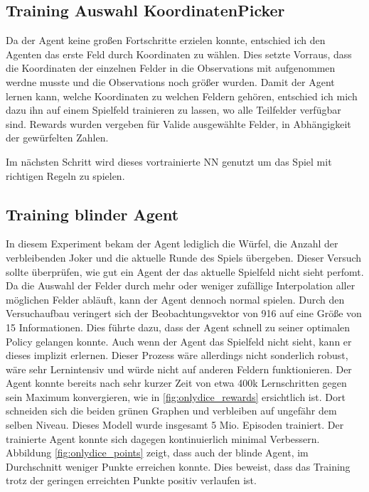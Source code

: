 \subsection{Training Auswahl KoordinatenPicker}
Da der Agent keine großen Fortschritte erzielen konnte, entschied ich den Agenten das erste Feld durch Koordinaten zu wählen.
Dies setzte Vorraus, dass die Koordinaten der einzelnen Felder in die Observations mit aufgenommen werdne musste und die Observations noch größer wurden.
Damit der Agent lernen kann, welche Koordinaten zu welchen Feldern gehören, entschied ich mich dazu ihn auf einem Spielfeld trainieren zu lassen, wo alle Teilfelder verfügbar sind.
Rewards wurden vergeben für Valide ausgewählte Felder, in Abhängigkeit der gewürfelten Zahlen.

Im nächsten Schritt wird dieses vortrainierte NN genutzt um das Spiel mit richtigen Regeln zu spielen.



\subsection{Training blinder Agent}
In diesem Experiment bekam der Agent lediglich die Würfel, die Anzahl der verbleibenden Joker und die aktuelle Runde des Spiels übergeben.
Dieser Versuch sollte überprüfen, wie gut ein Agent der das aktuelle Spielfeld nicht sieht perfomt. Da die Auswahl der Felder durch mehr oder weniger zufällige Interpolation aller möglichen Felder abläuft, kann der Agent dennoch normal spielen. Durch den Versuchaufbau veringert sich der Beobachtungsvektor von 916 auf eine Größe von 15 Informationen. Dies führte dazu, dass der Agent schnell zu seiner optimalen Policy gelangen konnte. Auch wenn der Agent das Spielfeld nicht sieht, kann er dieses implizit erlernen. Dieser Prozess wäre allerdings nicht sonderlich robust, wäre sehr Lernintensiv und würde nicht auf anderen Feldern funktionieren. Der Agent konnte bereits nach sehr kurzer Zeit von etwa 400k Lernschritten gegen sein Maximum konvergieren, wie in \ref{fig:onlydice_rewards} ersichtlich ist. Dort schneiden sich die beiden grünen Graphen und verbleiben auf ungefähr dem selben Niveau. Dieses Modell wurde insgesamt 5 Mio. Episoden trainiert. Der trainierte Agent konnte sich dagegen kontinuierlich minimal Verbessern. \\
Abbildung \ref{fig:onlydice_points} zeigt, dass auch der blinde Agent, im Durchschnitt weniger Punkte erreichen konnte. Dies beweist, dass das Training trotz der geringen erreichten Punkte positiv verlaufen ist.


